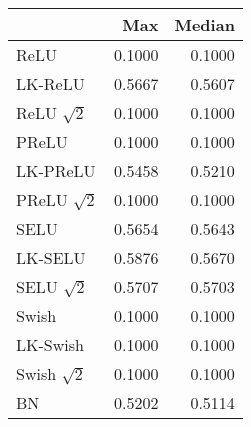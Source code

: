 \begin{tabular}{lrr}
\toprule
{} &     Max &  Median \\
\midrule
ReLU             &  0.1000 &  0.1000 \\
LK-ReLU          &  0.5667 &  0.5607 \\
ReLU $\sqrt{2}$  &  0.1000 &  0.1000 \\
PReLU            &  0.1000 &  0.1000 \\
LK-PReLU         &  0.5458 &  0.5210 \\
PReLU $\sqrt{2}$ &  0.1000 &  0.1000 \\
SELU             &  0.5654 &  0.5643 \\
LK-SELU          &  0.5876 &  0.5670 \\
SELU $\sqrt{2}$  &  0.5707 &  0.5703 \\
Swish            &  0.1000 &  0.1000 \\
LK-Swish         &  0.1000 &  0.1000 \\
Swish $\sqrt{2}$ &  0.1000 &  0.1000 \\
BN               &  0.5202 &  0.5114 \\
\bottomrule
\end{tabular}
